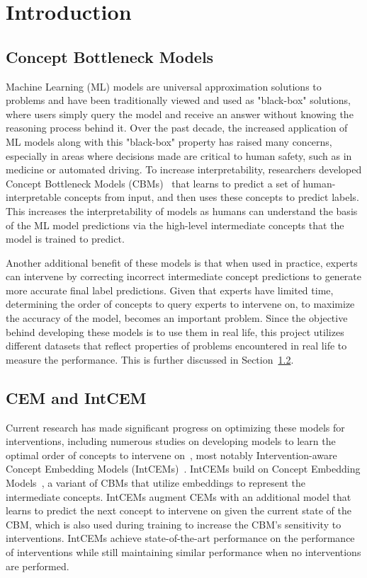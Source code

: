 \documentclass[../main.tex]{subfiles}
\begin{document}
\chapter{Introduction}
\label{firstcontentpage}

\section{Concept Bottleneck Models}
Machine Learning (ML) models are universal approximation solutions to problems
and have been traditionally viewed and used as "black-box" solutions, 
where users simply query the model and receive an answer without knowing the
 reasoning process behind it. Over the past decade,
the increased application of ML models along with this "black-box" property has
raised many concerns, especially in areas where decisions made are critical to
human safety, such as in medicine or automated driving. To increase
interpretability, researchers developed Concept Bottleneck Models (CBMs)~\cite{cbm} that 
learns to predict a set of human-interpretable concepts from input, and then uses these
concepts to predict labels. This increases the interpretability of models
as humans
can understand the basis of the ML model predictions via the high-level 
intermediate concepts that the model is trained to predict. 

Another additional benefit of these models is that when used in 
practice, experts can intervene by correcting incorrect intermediate
concept predictions to
generate more accurate final label predictions.
Given that experts have limited time, determining 
the order of concepts to query experts to intervene on, 
to maximize the accuracy of the model, 
becomes an important problem.
Since the objective behind developing these models is to
use them in real life, this project utilizes different
datasets that reflect properties of problems encountered in real life
to measure the performance. 
This is further discussed in Section~\ref{}.

\section{CEM and IntCEM}
Current research has made significant progress on optimizing these models for 
interventions,
including numerous studies on developing models to learn
the optimal order of concepts to intervene on~\cite{coop},
most notably Intervention-aware Concept Embedding Models (IntCEMs)~\cite{intcem}. 
IntCEMs build on
Concept Embedding Models~\cite{cem}, a variant of CBMs that utilize 
embeddings to represent the intermediate concepts. 
IntCEMs augment CEMs with an additional
model that learns to predict the next concept to intervene on given the current state
of the CBM, which is also used during training to increase the CBM's
sensitivity to interventions. IntCEMs achieve state-of-the-art performance on
the performance of interventions while still maintaining similar performance when
no interventions are performed.
\end{document}
